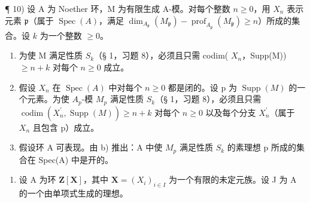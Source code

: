 ¶ 10) 设 A 为 Noether 环，M 为有限生成 A-模。对每个整数 \(n \geqslant 0\)，用 \(X_{n}\) 表示元素 \(\mathfrak{p}\)（属于 \(\operatorname{Spec}(A)\)，满足 \(\dim_{A_{\mathfrak{p}}}(M_{\mathfrak{p}}) - \operatorname{prof}_{A_{\mathfrak{p}}}(M_{\mathfrak{p}}) \geqslant n\)）所成的集合。设 \(k\) 为一个整数 \(\geqslant 0\)。

\begin{enumerate}
\def\labelenumi{\alph{enumi})}
\item
  为使 M 满足性质 \(S_{k}\)（§ 1，习题 8），必须且只需 codim( \(X_{n}\)，Supp(M)) \(\geqslant n + k\) 对每个 \(n \geqslant 0\) 成立。
\item
  假设 \(X_{n}\) 在 \(\operatorname{Spec}(A)\) 中对每个 \(n \geqslant 0\) 都是闭的。设 p 为 \(\operatorname{Supp}(M)\) 的一个元素。为使 \(A_{p}\)-模 \(M_{p}\) 满足性质 \(S_{k}\)（§ 1，习题 8），必须且只需 \(\operatorname{codim}(X_{n}^{\prime}, \operatorname{Supp}(M)) \geqslant n + k\) 对每个 \(n \geqslant 0\) 以及每个分支 \(X_{n}^{\prime}\)（属于 \(X_{n}\) 且包含 p）成立。
\item
  假设环 A 可表现。由 b) 推出：A 中使 \(M_{p}\) 满足性质 \(S_{k}\) 的素理想 p 所成的集合在 Spec(A) 中是开的。
\end{enumerate}

\begin{enumerate}
\def\labelenumi{\arabic{enumi})}
\setcounter{enumi}{10}
\tightlist
\item
  设 A 为环 \(\mathbf{Z}[\mathbf{X}]\)，其中 \(\mathbf{X} = (X_i)_{i\in I}\) 为一个有限的未定元族。设 J 为 A 的一个由单项式生成的理想。
\end{enumerate}

